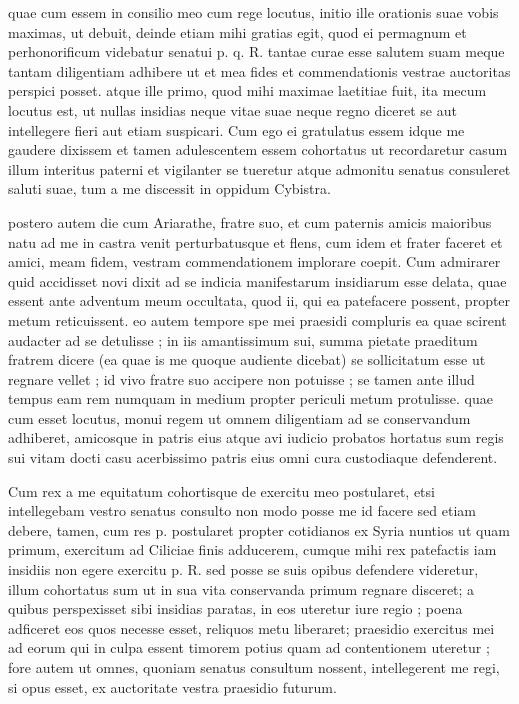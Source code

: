  quae cum essem in consilio meo cum rege locutus, initio ille orationis suae vobis maximas, ut debuit, deinde etiam mihi gratias egit, quod ei permagnum et perhonorificum videbatur senatui p. q. R. tantae curae esse salutem suam meque tantam diligentiam adhibere ut et mea fides et commendationis vestrae auctoritas perspici posset. atque ille primo, quod mihi maximae laetitiae fuit, ita mecum locutus est, ut nullas insidias neque vitae suae neque regno diceret se aut intellegere fieri aut etiam suspicari. Cum ego ei gratulatus essem idque me gaudere dixissem et tamen adulescentem essem cohortatus ut recordaretur casum illum interitus paterni et vigilanter se tueretur atque admonitu senatus consuleret saluti suae, tum a me discessit in oppidum Cybistra.

 postero autem die cum Ariarathe, fratre suo, et cum paternis amicis maioribus natu ad me in castra venit perturbatusque et flens, cum idem et frater faceret et amici, meam fidem, vestram commendationem implorare coepit. Cum admirarer quid accidisset novi dixit ad se indicia manifestarum insidiarum esse delata, quae essent ante adventum meum occultata, quod ii, qui ea patefacere possent, propter metum reticuissent. eo autem tempore spe mei praesidi compluris ea quae scirent audacter ad se detulisse ; in iis amantissimum sui, summa pietate praeditum fratrem dicere (ea quae is me quoque audiente dicebat) se sollicitatum esse ut regnare vellet ; id vivo fratre suo accipere non potuisse ; se tamen ante illud tempus eam rem numquam in medium propter periculi metum protulisse. quae cum esset locutus, monui regem ut omnem diligentiam ad se conservandum adhiberet, amicosque in patris eius atque avi iudicio probatos hortatus sum regis sui vitam docti casu acerbissimo patris eius omni cura custodiaque defenderent.

 Cum rex a me equitatum cohortisque de exercitu meo postularet, etsi intellegebam vestro senatus consulto non modo posse me id facere sed etiam debere, tamen, cum res p. postularet propter cotidianos ex Syria nuntios ut quam primum, exercitum ad Ciliciae finis adducerem, cumque mihi rex patefactis iam insidiis non egere exercitu p. R. sed posse se suis opibus defendere videretur, illum cohortatus sum ut in sua vita conservanda primum regnare disceret; a quibus perspexisset sibi insidias paratas, in eos uteretur iure regio ; poena adficeret eos quos necesse esset, reliquos metu liberaret; praesidio exercitus mei ad eorum qui in culpa essent timorem potius quam ad contentionem uteretur ; fore autem ut omnes, quoniam senatus consultum nossent, intellegerent me regi, si opus esset, ex auctoritate vestra praesidio futurum.

